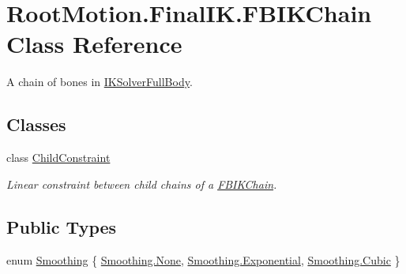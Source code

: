 \hypertarget{class_root_motion_1_1_final_i_k_1_1_f_b_i_k_chain}{}\section{Root\+Motion.\+Final\+I\+K.\+F\+B\+I\+K\+Chain Class Reference}
\label{class_root_motion_1_1_final_i_k_1_1_f_b_i_k_chain}


A chain of bones in \mbox{\hyperlink{class_root_motion_1_1_final_i_k_1_1_i_k_solver_full_body}{I\+K\+Solver\+Full\+Body}}.  


\subsection*{Classes}
\begin{DoxyCompactItemize}
\item 
class \mbox{\hyperlink{class_root_motion_1_1_final_i_k_1_1_f_b_i_k_chain_1_1_child_constraint}{Child\+Constraint}}
\begin{DoxyCompactList}\small\item\em Linear constraint between child chains of a \mbox{\hyperlink{class_root_motion_1_1_final_i_k_1_1_f_b_i_k_chain}{F\+B\+I\+K\+Chain}}. \end{DoxyCompactList}\end{DoxyCompactItemize}
\subsection*{Public Types}
\begin{DoxyCompactItemize}
\item 
enum \mbox{\hyperlink{class_root_motion_1_1_final_i_k_1_1_f_b_i_k_chain_a2c75de88180a5922368eaa4c4efb3ac9}{Smoothing}} \{ \mbox{\hyperlink{class_root_motion_1_1_final_i_k_1_1_f_b_i_k_chain_a2c75de88180a5922368eaa4c4efb3ac9a6adf97f83acf6453d4a6a4b1070f3754}{Smoothing.\+None}}, 
\mbox{\hyperlink{class_root_motion_1_1_final_i_k_1_1_f_b_i_k_chain_a2c75de88180a5922368eaa4c4efb3ac9ac1e19c09f700938f0ff7f1fd4722a3ac}{Smoothing.\+Exponential}}, 
\mbox{\hyperlink{class_root_motion_1_1_final_i_k_1_1_f_b_i_k_chain_a2c75de88180a5922368eaa4c4efb3ac9aec6b5414eb175379ff9efc9b3eef5814}{Smoothing.\+Cubic}}
 \}
\end{DoxyCompactItemize}
